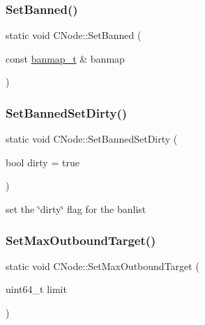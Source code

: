 \mbox{\label{class_c_node_a359a988c6d809cf7a4644c263be04d2e}} 
\subsubsection{\texorpdfstring{Set\+Banned()}{SetBanned()}}
{\footnotesize\ttfamily static void C\+Node\+::\+Set\+Banned (\begin{DoxyParamCaption}\item[{const \mbox{\hyperlink{net_8h_af9675d81650e48d20ae495adf73da102}{banmap\+\_\+t}} \&}]{banmap }\end{DoxyParamCaption})\hspace{0.3cm}{\ttfamily [static]}}

\mbox{\label{class_c_node_a8937c6802f7f41547a24ac6cecea25b4}} 
\subsubsection{\texorpdfstring{Set\+Banned\+Set\+Dirty()}{SetBannedSetDirty()}}
{\footnotesize\ttfamily static void C\+Node\+::\+Set\+Banned\+Set\+Dirty (\begin{DoxyParamCaption}\item[{bool}]{dirty = {\ttfamily true} }\end{DoxyParamCaption})\hspace{0.3cm}{\ttfamily [static]}}



set the \char`\"{}dirty\char`\"{} flag for the banlist 

\mbox{\label{class_c_node_ad906c5639c15089c36c1f1e5820ef070}} 
\subsubsection{\texorpdfstring{Set\+Max\+Outbound\+Target()}{SetMaxOutboundTarget()}}
{\footnotesize\ttfamily static void C\+Node\+::\+Set\+Max\+Outbound\+Target (\begin{DoxyParamCaption}\item[{uint64\+\_\+t}]{limit }\end{DoxyParamCaption})\hspace{0.3cm}{\ttfamily [static]}}



